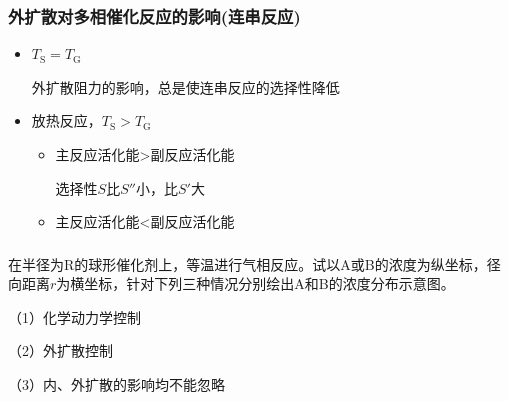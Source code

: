 \begin{frame}
    \frametitle{外扩散对多相催化反应的影响(连串反应)}

    \begin{itemize}
        \item $T_\mathrm{S} = T_\mathrm{G}$
        
        外扩散阻力的影响，总是使连串反应的选择性降低
        \item 放热反应，$T_\mathrm{S} > T_\mathrm{G}$
            \begin{itemize}
                \item[\bullet] 主反应活化能>副反应活化能
                
                选择性$S$比$S''$小，比$S'$大
                \item[\bullet] 主反应活化能<副反应活化能
            \end{itemize}
    \end{itemize}
\end{frame}


\begin{frame}[t]
    \frametitle{}

    \begin{example}
        在半径为R的球形催化剂上，等温进行气相反应。试以A或B的浓度为纵坐标，径向距离$r$为横坐标，针对下列三种情况分别绘出A和B的浓度分布示意图。
    
    （1）化学动力学控制

    （2）外扩散控制

    （3）内、外扩散的影响均不能忽略

    \end{example}

\end{frame}